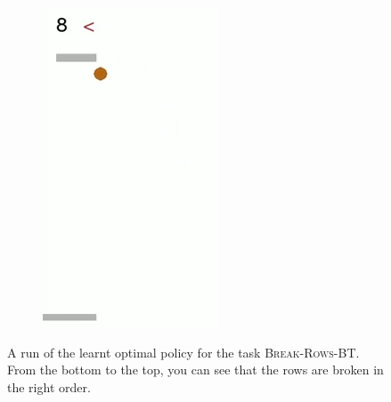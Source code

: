 \begin{figure}[h]
\begin{subfigure}[b]{0.23\textwidth}
		\includegraphics[width=\textwidth]{images/breakout-33-bt-3.png}
	\end{subfigure}
	\caption{A run of the learnt optimal policy for the task \textsc{Break-Rows-BT}. From the bottom to the top, you can see that the rows are broken in the right order.}\label{exa:breakout-33-bt}
\end{figure}



